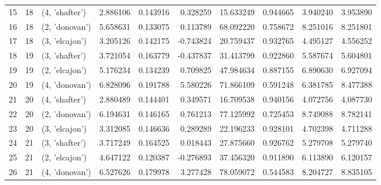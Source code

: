 \begin{tabular}{lrlrrrrrrr}
15 &     18 &  (4, 'shafter') &  2.886106 &  0.143916 &  0.328259 &   15.633249 &  0.944665 &   3.940240 &   3.953890 \\
16 &     18 &  (2, 'donovan') &  5.658631 &  0.133075 &  0.113789 &   68.092220 &  0.758672 &   8.251016 &   8.251801 \\
17 &     18 &  (3, 'elcajon') &  3.205126 &  0.142175 & -0.743824 &   20.759437 &  0.932765 &   4.495127 &   4.556252 \\
18 &     19 &  (3, 'shafter') &  3.721054 &  0.163779 & -0.437837 &   31.413799 &  0.922860 &   5.587674 &   5.604801 \\
19 &     19 &  (2, 'elcajon') &  5.176234 &  0.134239 &  0.709825 &   47.984634 &  0.887155 &   6.890630 &   6.927094 \\
20 &     19 &  (4, 'donovan') &  6.828096 &  0.191788 &  5.580226 &   71.866109 &  0.591248 &   6.381785 &   8.477388 \\
21 &     20 &  (4, 'shafter') &  2.880489 &  0.144401 &  0.349571 &   16.709538 &  0.940156 &   4.072756 &   4.087730 \\
22 &     20 &  (2, 'donovan') &  6.194631 &  0.146165 &  0.761213 &   77.125992 &  0.725453 &   8.749088 &   8.782141 \\
23 &     20 &  (3, 'elcajon') &  3.312085 &  0.146636 &  0.289289 &   22.196233 &  0.928101 &   4.702398 &   4.711288 \\
24 &     21 &  (3, 'shafter') &  3.717249 &  0.164525 &  0.018443 &   27.875660 &  0.926762 &   5.279708 &   5.279740 \\
25 &     21 &  (2, 'elcajon') &  4.647122 &  0.120387 & -0.276893 &   37.456320 &  0.911890 &   6.113890 &   6.120157 \\
26 &     21 &  (4, 'donovan') &  6.527626 &  0.179978 &  3.277428 &   78.059072 &  0.544583 &   8.204727 &   8.835105 \\
\bottomrule
\end{tabular}
